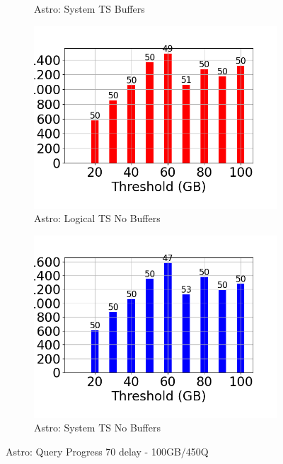\begin{figure}
\begin{subfigure}[c]{0.48\textwidth}
		\caption{Astro: System TS Buffers}
		\label{fig:system-ts-70-astro}
	\end{subfigure}
	\begin{subfigure}[c]{0.48\textwidth}
		\includegraphics[width=1\textwidth]	 {figures/Experiments/Dynamic/ASTRO/Batch_processing/70/average_query_time_per_batch_version_999777016_10485760_10_delay[70].png}
		\caption{Astro: Logical TS No Buffers}
		\label{fig:logical-ts-no-70-astro}
	\end{subfigure}
	\begin{subfigure}[c]{0.48\textwidth}
		\includegraphics[width=1\textwidth]	 {figures/Experiments/Dynamic/ASTRO/Batch_processing/70/average_query_time_per_batch_version_999777017_10485760_10_delay[70].png}
		\caption{Astro: System TS No Buffers}
		\label{fig:system-ts-no-70-astro}
	\end{subfigure}
	\caption{Astro: Query Progress 70 delay - 100GB/450Q}
	\label{fig:query-progress-70-astro}
\end{figure}

